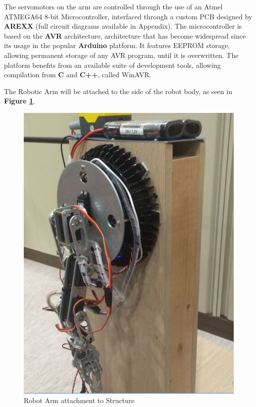 \documentclass[12p,a4paper]{report}
\begin{document}
The servomotors on the arm are controlled through the use of an Atmel ATMEGA64 8-bit Microcontroller, interfaced through a custom PCB designed by \textbf{AREXX} (full circuit diagrams available in Appendix). The microcontroller is based on the \textbf{AVR} architecture, architecture that has become widespread since its usage in the popular \textbf{Arduino} platform. It features EEPROM storage, allowing permanent storage of any AVR program, until it is overwritten. The platform benefits from an available suite of development tools, allowing compilation from \textbf{C} and \textbf{C++}, called WinAVR.

The Robotic Arm will be attached to the side of the robot body, as seen in \textbf{Figure \ref{fig:robotarm_attached}}.

\begin{figure}[H]
\begin{center}
\includegraphics[scale=0.50]{robotarm_attached_low}
\caption{Robot Arm attachment to Structure}
\label{fig:robotarm_attached}
\end{center}
\end{figure}
\end{document}
